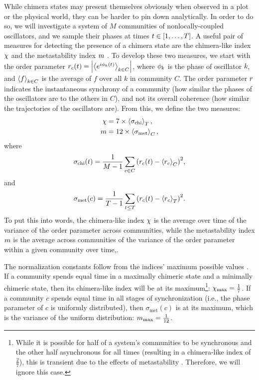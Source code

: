While chimera states may present themselves obviously when observed in a plot or the physical world, they can be harder to pin down analytically.
In order to do so, we will investigate a system of $M$ communities of nonlocally-coupled oscillators, and we sample their phases at times $t \in \bqty{1, \ldots, T}$.
A useful pair of measures for detecting the presence of a chimera state are the chimera-like index $\chi$ and the metastability index $m$ \cite{Shanahan2010,Hizanidis2016}.
To develop these two measures, we start with the order parameter $r_{c}(t) = \abs{\expval{e^{i \phi_{k}(t)}}_{k \in C}}$, where $\phi_{k}$ is the phase of oscillator $k$, and $\ev{f}_{k \in C}$ is the average of $f$ over all $k$ in community $C$.
The order parameter $r$ indicates the instantaneous synchrony of a community (how similar the phases of the oscillators are to the others in $C$), and not its overall coherence (how similar the trajectories of the oscillators are).
From this, we define the two measures:
\begin{align}
  \label{eq:chimera}
  \chimera
  &=
    7 \times \expval{\sigma_{\text{chi}}}_{T}, \\
  \label{eq:metastability}
  \meta
  &=
    12 \times \expval{\sigma_{\text{met}}}_{C},
\end{align}
where
\begin{equation}
  \sigma_{\text{chi}}(t)
  =
  \frac{1}{M - 1} \sum_{c \in C}\pqty{\ordparam_{c}(t) - \expval{\ordparam_{c}}_{C}}^{2},
\end{equation}
and
\begin{equation}
  \sigma_{\text{met}}(c)
  =
  \frac{1}{T - 1} \sum_{t \leq T}\pqty{\ordparam_{c}(t) - \expval{\ordparam_{c}}_{T}}^{2}.
\end{equation}
To put this into words, the chimera-like index $\chi$ is the average over time of the variance of the order parameter across communities, while the metastability index $m$ is the average across communities of the variance of the order parameter within a given community over time,.

The normalization constants follow from the indices' maximum possible values \cite{Shanahan2010}.
If a community spends equal time in a maximally chimeric state and a minimally chimeric state, then its chimera-like index will be at its maximum\footnote{While it is possible for half of a system's communities to be synchronous and the other half asynchronous for all times (resulting in a chimera-like index of $\frac{2}{7}$), this is transient due to the effects of metastability \cite{Shanahan2010}.  Therefore, we will ignore this case.}: $\chi_{\text{max}} = \frac{1}{7}$.
If a community $c$ spends equal time in all stages of synchronization (i.e., the phase parameter of $c$ is uniformly distributed), then $\sigma_{\text{met}}(c)$ is at its maximum, which is the variance of the uniform distribution: $m_{\text{max}} = \frac{1}{12}$.


